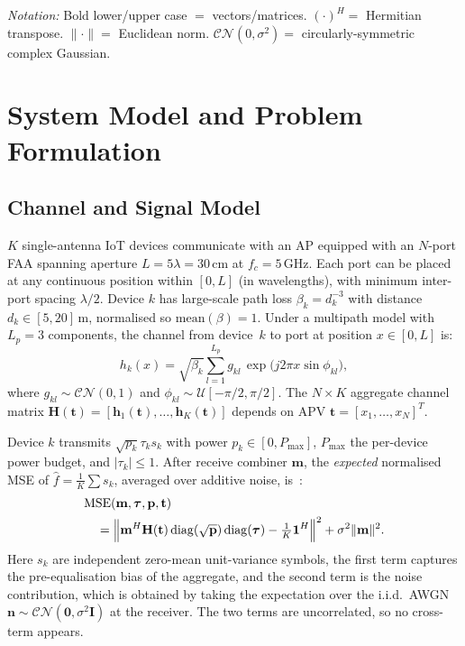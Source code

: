 \documentclass[journal,letterpaper,10pt,twocolumn]{IEEEtran}
\begin{document}
\textit{Notation:} Bold lower/upper case $=$ vectors/matrices.
$(\cdot)^{H}=$ Hermitian transpose. $\|\cdot\|=$ Euclidean norm.
$\mathcal{CN}(0,\sigma^{2})=$ circularly-symmetric complex Gaussian.

\section{System Model and Problem Formulation}

\subsection{Channel and Signal Model}

$K$ single-antenna IoT devices communicate with an AP equipped with an
$N$-port FAA spanning aperture $L\!=\!5\lambda\!=\!30$\,cm at
$f_{c}\!=\!5$\,GHz. Each port can be placed at any continuous position
within $[0,L]$ (in wavelengths), with minimum inter-port spacing
$\lambda/2$. Device $k$ has large-scale path loss $\beta_{k}\!=\!d_{k}^{-3}$
with distance $d_{k}\!\in\![5,20]$\,m, normalised so
$\text{mean}(\beta)\!=\!1$. Under a multipath model with $L_{p}\!=\!3$
components, the channel from device~$k$ to port at position
$x\!\in\![0,L]$ is:
\begin{equation}
  h_{k}(x) = \sqrt{\beta_{k}}\sum_{l=1}^{L_{p}}
  g_{kl}\,\exp\!\bigl(j2\pi x\sin\phi_{kl}\bigr),
  \label{eq:channel}
\end{equation}
where $g_{kl}\!\sim\!\mathcal{CN}(0,1)$ and
$\phi_{kl}\!\sim\!\mathcal{U}[-\pi/2,\pi/2]$. The $N\!\times\!K$
aggregate channel matrix $\mathbf{H}(\mathbf{t})\!=\!
[\mathbf{h}_{1}(\mathbf{t}),\ldots,\mathbf{h}_{K}(\mathbf{t})]$ depends
on APV $\mathbf{t}\!=\![x_{1},\ldots,x_{N}]^{T}$.

Device $k$ transmits $\sqrt{p_{k}}\tau_{k}s_{k}$ with power
$p_{k}\!\in\![0,P_{\max}]$, $P_{\max}$ the per-device power budget, and $|\tau_{k}|\!\leq\!1$. After receive
combiner $\mathbf{m}$, the \textit{expected} normalised MSE of
$\hat{f}\!=\!\frac{1}{K}\sum s_{k}$, averaged over additive noise,
is~\cite{Zhang2024}:
\begin{align}
  &\text{MSE}(\mathbf{m},\boldsymbol{\tau},\mathbf{p},\mathbf{t}) \nonumber\\
  &\quad=\Bigl\|\mathbf{m}^{H}\mathbf{H}(\mathbf{t})
        \operatorname{diag}(\sqrt{\mathbf{p}})\operatorname{diag}(\boldsymbol{\tau})
        -\tfrac{1}{K}\mathbf{1}^{H}\Bigr\|^{2}
        +\sigma^{2}\|\mathbf{m}\|^{2}.
  \label{eq:mse}
\end{align}
Here $s_{k}$ are independent zero-mean unit-variance symbols, the first
term captures the pre-equalisation bias of the aggregate, and the second
term is the noise contribution, which is obtained by taking the
expectation over the i.i.d.\ AWGN $\mathbf{n}\!\sim\!\mathcal{CN}(\mathbf{0},\sigma^{2}\mathbf{I})$
at the receiver. The two terms are uncorrelated, so no cross-term
appears.
\end{document}
